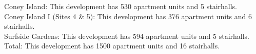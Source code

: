 {Coney Island}: This development has 530 apartment units and 5 stairhalls.\\{Coney Island I (Sites 4 \& 5)}: This development has 376 apartment units and 6 stairhalls.\\{Surfside Gardens}: This development has 594 apartment units and 5 stairhalls.\\{Total}: This development has 1500 apartment units and 16 stairhalls.\\